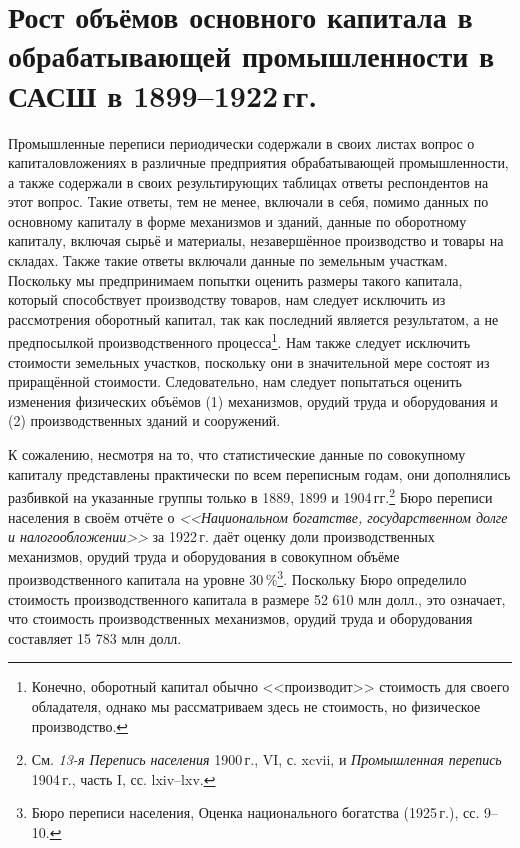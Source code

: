 \documentclass[leqno]{article}  %
\begin{document}
\section{Рост объёмов основного капитала в обрабатывающей промышленности в САСШ в 1899--1922\,гг.}
Промышленные переписи периодически содержали в своих листах вопрос о капиталовложениях в различные предприятия обрабатывающей промышленности, а также содержали в своих результирующих таблицах ответы респондентов на этот вопрос. Такие ответы, тем не менее, включали в себя, помимо данных по основному капиталу в форме механизмов и зданий, данные по оборотному капиталу, включая сырьё и материалы, незавершённое производство и товары на складах. Также такие ответы включали данные по земельным участкам. Поскольку мы предпринимаем попытки оценить размеры такого капитала, который способствует производству товаров, нам следует исключить из рассмотрения оборотный капитал, так как последний является результатом, а не предпосылкой производственного процесса\footnote{Конечно, оборотный капитал обычно <<производит>> стоимость для своего обладателя, однако мы рассматриваем здесь не стоимость, но физическое производство.}. Нам также следует исключить стоимости земельных участков, поскольку они в значительной мере состоят из приращённой стоимости. Следовательно, нам следует попытаться оценить изменения физических объёмов (1) механизмов, орудий труда и оборудования и (2) производственных зданий и сооружений.
\par
К сожалению, несмотря на то, что статистические данные по совокупному капиталу представлены практически по всем переписным годам, они дополнялись разбивкой на указанные группы только в 1889, 1899 и 1904\,гг.\footnote{См. \emph{13-я Перепись населения} 1900\,г., VI, с. xcvii, и \emph{Промышленная перепись} 1904\,г., часть I, сс. lxiv--lxv.}  Бюро переписи населения в своём отчёте о \emph{<<Национальном богатстве, государственном долге и налогообложении>>} за 1922\,г. даёт оценку доли производственных механизмов, орудий труда и оборудования в совокупном объёме производственного капитала на уровне 30\,\%\footnote{Бюро переписи населения, Оценка национального богатства (1925\,г.), сс. 9--10.}. Поскольку Бюро определило стоимость производственного капитала в размере 52 610 млн долл., это означает, что стоимость производственных механизмов, орудий труда и оборудования составляет 15 783 млн долл.
\par
\end{document}
